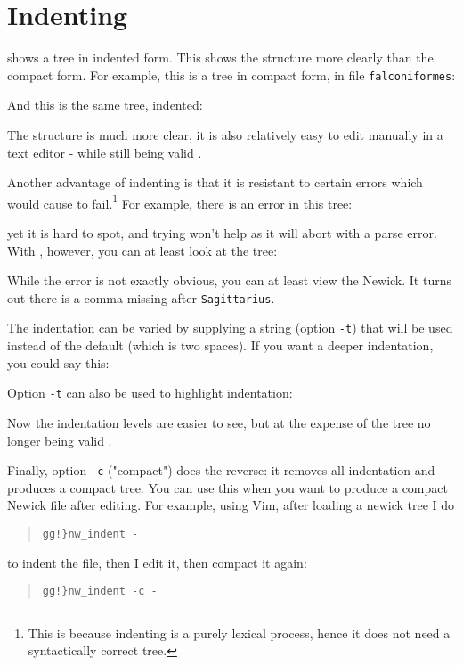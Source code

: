 
\section{Indenting}
\label{sct_indent}

\nwindent{} shows a \nw{} tree in indented form. This shows the structure more
clearly than the compact form. For example, this is a tree in compact form, in
file \texttt{falconiformes}:

And this is the same tree, indented:


The structure is much more clear, it is also relatively easy to edit manually
in a text editor - while still being valid \nw.

Another advantage of indenting is that it is resistant to certain errors
which would cause \display{} to fail.\footnote{This is
because indenting is a purely lexical process, hence it does not need a
syntactically correct tree.} For example, there is an error in this tree:

yet it is hard to spot, and trying \display{} won't help as it will abort with a
parse error. With \nwindent{}, however, you can at least look at the tree:

While the error is not exactly obvious, you can at least view the Newick. It turns out there is a comma missing after \texttt{Sagittarius}.

The indentation can be varied by supplying a string (option \texttt{-t}) that
will be used instead of the default (which is two spaces). If you want a deeper
indentation, you could say this:


Option \texttt{-t} can also be used to highlight indentation:


Now the indentation levels are easier to see, but at the expense of the tree no
longer being valid \nw.

Finally, option \texttt{-c} ("compact") does the reverse: it removes all
indentation and produces a compact tree. You can use this when you want to
produce a compact Newick file after editing. For example, using Vim, after
loading a newick tree I do 
\begin{quote}
\verb+gg!}nw_indent -+
\end{quote}
to indent the file, then I edit it, then compact it again:
\begin{quote}
\verb+gg!}nw_indent -c -+
\end{quote}

